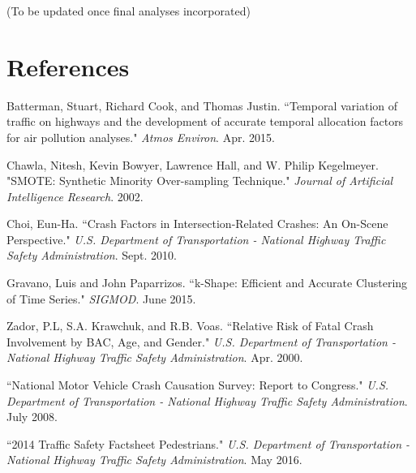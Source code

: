 \documentclass[11pt, oneside,titlepage]{article}   	%
\begin{document}
(To be updated once final analyses incorporated)


\section*{References}
\begin{hangparas}{1.27cm}{1}
Batterman, Stuart, Richard Cook, and Thomas Justin. ``Temporal variation of traffic on highways and the development of accurate temporal allocation factors for air pollution analyses." \textit{Atmos Environ}. Apr. 2015.

Chawla, Nitesh, Kevin Bowyer, Lawrence Hall, and W. Philip Kegelmeyer. "SMOTE: Synthetic Minority Over-sampling Technique." \textit{Journal of Artificial Intelligence Research}. 2002.

Choi, Eun-Ha. ``Crash Factors in Intersection-Related Crashes: An On-Scene Perspective." \textit{U.S. Department of Transportation - National Highway Traffic Safety Administration}. Sept. 2010.

Gravano, Luis and John Paparrizos. ``k-Shape: Efficient and Accurate Clustering of Time Series." \textit{SIGMOD}. June 2015.

Zador, P.L, S.A. Krawchuk, and R.B. Voas. ``Relative Risk of Fatal Crash Involvement by BAC, Age, and Gender." \textit{U.S. Department of Transportation - National Highway Traffic Safety Administration}. Apr. 2000.

``National Motor Vehicle Crash Causation Survey: Report to Congress." \textit{U.S. Department of Transportation - National Highway Traffic Safety Administration}. July 2008.

``2014 Traffic Safety Factsheet Pedestrians." \textit{U.S. Department of Transportation - National Highway Traffic Safety Administration}. May 2016.

\end{hangparas}
\end{document}
